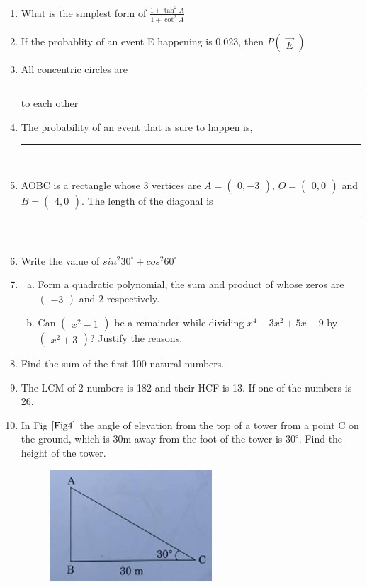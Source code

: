 \documentclass[journal,12pt,twocolumn]{IEEEtran}
\newcommand{\myvec}[1]{\ensuremath{\begin{pmatrix}#1\end{pmatrix}}}
\begin{document}
\begin{enumerate}[label=2.\arabic*]
\item What is the simplest form of $\frac{1 + \tan^2 A}{1 + \cot^2 A}$\\
\item If the probablity of an event E happening is 0.023, then $P\myvec{\Vec{E}}$\\
\item All concentric circles are \rule{1.5cm}{0.15mm} to each other\\

\item The probability of an event that is sure to happen is, \rule{1.5cm}{0.15mm}\\

\item AOBC is a rectangle whose 3 vertices are $A = \myvec{0,-3}$, $O = \myvec{0,0}$ and $B = \myvec{4,0}$. The length of the diagonal is \rule{1.5cm}{0.15mm}\\

\item Write the value of $sin^2 30^\circ + cos^2 60^\circ$\\

\item \begin{enumerate}[a)]
    \item Form a quadratic polynomial, the sum and product of whose zeros are $\myvec{-3}$ and $2$ respectively.\\
    \item Can $\myvec{x^2 - 1}$ be a remainder while dividing $x^4 - 3x^2 + 5x - 9$ by $\myvec{x^2 + 3}$? Justify the reasons.\\
\end{enumerate}

\item Find the sum of the first 100 natural numbers.\\

\item The LCM of 2 numbers is 182 and their HCF is 13. If one of the numbers is 26.\\

\item In Fig $\ref{Fig4}$ the angle of elevation from the top of a tower from a point C on the ground, which is 30m away from the foot of the tower is $30^\circ$. Find the height of the tower.\\

\begin{figure}[h!]
    \centering
    \includegraphics[width=0.5\columnwidth,center]{Fig4.png}
	\caption{}
	\label{Fig4}
 \end{figure}
\end{enumerate}
\end{document}

